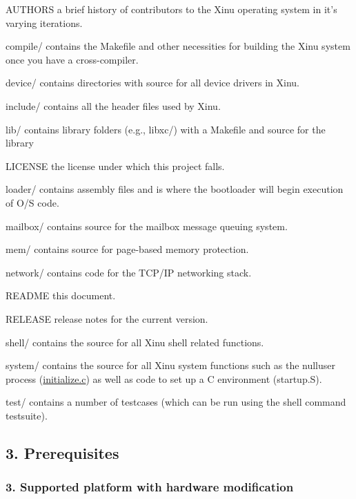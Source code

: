 \begin{DoxyItemize}
\item {\ttfamily A\-U\-T\-H\-O\-R\-S} a brief history of contributors to the Xinu operating system in it's varying iterations.
\item {\ttfamily compile/} contains the Makefile and other necessities for building the Xinu system once you have a cross-\/compiler.
\item {\ttfamily device/} contains directories with source for all device drivers in Xinu.
\item {\ttfamily include/} contains all the header files used by Xinu.
\item {\ttfamily lib/} contains library folders (e.\-g., {\ttfamily libxc/}) with a Makefile and source for the library
\item {\ttfamily L\-I\-C\-E\-N\-S\-E} the license under which this project falls.
\item {\ttfamily loader/} contains assembly files and is where the bootloader will begin execution of O/\-S code.
\item {\ttfamily mailbox/} contains source for the mailbox message queuing system.
\item {\ttfamily mem/} contains source for page-\/based memory protection.
\item {\ttfamily network/} contains code for the T\-C\-P/\-I\-P networking stack.
\item {\ttfamily R\-E\-A\-D\-M\-E} this document.
\item {\ttfamily R\-E\-L\-E\-A\-S\-E} release notes for the current version.
\item {\ttfamily shell/} contains the source for all Xinu shell related functions.
\item {\ttfamily system/} contains the source for all Xinu system functions such as the nulluser process ({\ttfamily \hyperlink{initialize_8c}{initialize.\-c}}) as well as code to set up a C environment ({\ttfamily startup.\-S}).
\item {\ttfamily test/} contains a number of testcases (which can be run using the shell command {\ttfamily testsuite}).
\end{DoxyItemize}

\subsection*{3. Prerequisites}

\subsubsection*{3. Supported platform with hardware modification}

